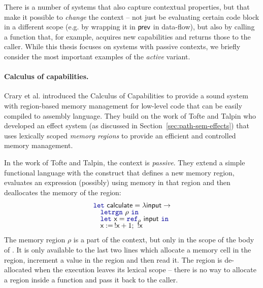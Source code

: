 There is a number of systems that also capture contextual properties, but that make it possible to 
\emph{change} the context -- not just be evaluating certain code block in a different scope (e.g. by 
wrapping it in $\textnormal{\sffamily prev}$ in data-flow), but also by calling a function that, for example, acquires 
new capabilities and returns those to the caller. While this thesis focuses on systems with passive 
contexts, we briefly consider the most important examples of the \emph{active} variant.


\paragraph{Calculus of capabilities.}
\label{sec:applications-active-ccc}

Crary et al. \cite{app-capabilities} introduced the Calculus of Capabilities to provide 
a sound system with region-based memory management for low-level code that can be easily 
compiled to assembly language. They build on the work of Tofte and Talpin \cite{app-region-memory}
who developed an effect system (as discussed in Section~\ref{sec:path-sem-effects}) that uses
lexically scoped \emph{memory regions} to provide an efficient and controlled memory management.

In the work of Tofte and Talpin, the context is \emph{passive}. They extend a simple functional language
with the  construct that defines a new memory region, evaluates an expression (possibly)
using memory in that region and then deallocates the memory of the region:
%
\begin{equation*}
\begin{array}{l}
\kvd{let}~\ident{calculate} = \lambda \ident{input} \rightarrow\\[-0.25em]
\quad \kvd{letrgn}~\rho~\kvd{in}\\[-0.25em]
\quad \kvd{let}~\ident{x} = \kvd{ref}_\rho ~\ident{input}~\kvd{in}\\[-0.25em]
\quad \ident{x} :=\, !\ident{x} + 1;~ !\ident{x}
\end{array}
\end{equation*}
%
The memory region $\rho$ is a part of the context, but only in the scope of the body of 
. It is only available to the last two lines which allocate a memory cell in the region,
increment a value in the region and then read it. The region is de-allocated when the execution 
leaves its lexical scope -- there is no way to allocate a region inside a function and pass it back 
to the caller.

